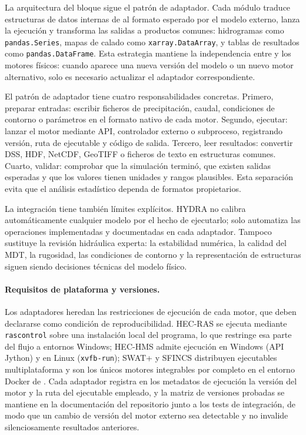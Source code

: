 La arquitectura del bloque sigue el patrón de adaptador. Cada módulo traduce estructuras de datos internas de \hydra al formato esperado por el modelo externo, lanza la ejecución y transforma las salidas a productos comunes: hidrogramas como \texttt{pandas.Series}, mapas de calado como \texttt{xarray.DataArray}, y tablas de resultados como \texttt{pandas.DataFrame}. Esta estrategia mantiene la independencia entre \hydra y los motores físicos: cuando aparece una nueva versión del modelo o un nuevo motor alternativo, solo es necesario actualizar el adaptador correspondiente.

El patrón de adaptador tiene cuatro responsabilidades concretas. Primero, preparar entradas: escribir ficheros de precipitación, caudal, condiciones de contorno o parámetros en el formato nativo de cada motor. Segundo, ejecutar: lanzar el motor mediante API, controlador externo o subproceso, registrando versión, ruta de ejecutable y código de salida. Tercero, leer resultados: convertir DSS, HDF, NetCDF, GeoTIFF o ficheros de texto en estructuras comunes. Cuarto, validar: comprobar que la simulación terminó, que existen salidas esperadas y que los valores tienen unidades y rangos plausibles. Esta separación evita que el análisis estadístico dependa de formatos propietarios.

La integración tiene también límites explícitos. HYDRA no calibra automáticamente cualquier modelo por el hecho de ejecutarlo; solo automatiza las operaciones implementadas y documentadas en cada adaptador. Tampoco sustituye la revisión hidráulica experta: la estabilidad numérica, la calidad del MDT, la rugosidad, las condiciones de contorno y la representación de estructuras siguen siendo decisiones técnicas del modelo físico.

\paragraph{Requisitos de plataforma y versiones.}
Los adaptadores heredan las restricciones de ejecución de cada motor, que deben declararse como condición de reproducibilidad. HEC-RAS se ejecuta mediante \texttt{rascontrol} sobre una instalación local del programa, lo que restringe esa parte del flujo a entornos Windows; HEC-HMS admite ejecución en Windows (API Jython) y en Linux (\texttt{xvfb-run}); SWAT+ y SFINCS distribuyen ejecutables multiplataforma y son los únicos motores integrables por completo en el entorno Docker de \hydra. Cada adaptador registra en los metadatos de ejecución la versión del motor y la ruta del ejecutable empleado, y la matriz de versiones probadas se mantiene en la documentación del repositorio junto a los tests de integración, de modo que un cambio de versión del motor externo sea detectable y no invalide silenciosamente resultados anteriores.

